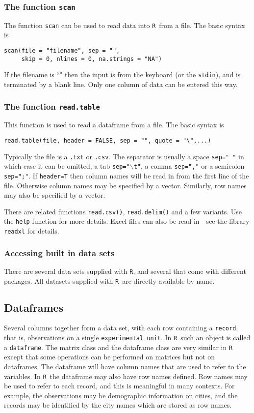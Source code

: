\documentclass[12pt,A4,makeidx]{article}
\newcommand{\tR}{\texttt{R}}
\begin{document}
\subsubsection{The function \texttt{scan}}
The function \texttt{scan} can be used to read data into \tR\ from a file.
The basic syntax is

\begin{verbatim}
scan(file = "filename", sep = "",
     skip = 0, nlines = 0, na.strings = "NA")
\end{verbatim}
If the filename is ``" then the input is from the keyboard (or the \texttt{stdin}), and is 
terminated by a blank line. Only one column of data can be entered this way.


\subsubsection{The function \texttt{read.table}}
This function is used to read a dataframe from a file. The basic syntax is
\begin{verbatim}
read.table(file, header = FALSE, sep = "", quote = "\",...)
\end{verbatim}
Typically the file is a \texttt{.txt} or \texttt{.csv}. The separator is usually a space \texttt{sep=" "} in which
case it can be omitted, a tab \texttt{sep="$\backslash$t"}, a comma \texttt{sep=","} or a semicolon \texttt{sep=";"}. If 
\texttt{header=T} then column names will be read in from the first line of the file. Otherwise column names
may be specified by a vector. Similarly, row names may also be specified by a vector.


There are related functions \texttt{read.csv()}, \texttt{read.delim()} and a few variants. 
Use the \texttt{help} function for more details. Excel files can also be read in---see the library 
\texttt{readxl} for details.

\subsubsection{Accessing built in data sets}

There are several data sets supplied with \tR, and several that come with different packages. 
All datasets supplied with \tR\ are directly available by name. 

\subsection{Dataframes}
Several columns together form a data set, with each
row containing a \texttt{record}, that is, observations on a single \texttt{experimental unit}. In \tR \ such an
object is called a \texttt{dataframe}. The matrix class and the dataframe class are very similar in \tR \, except that
some operations can be performed on matrices but not on dataframes. The dataframe will have column names 
that are used to refer to the variables.
In \tR \ the dataframe may also have row names defined. Row names may be used to refer to each record,
and this is meaningful in many contexts. For example, the observations may be demographic information on cities,
and the records may be identified by the city names which are stored as row names.
\end{document}
